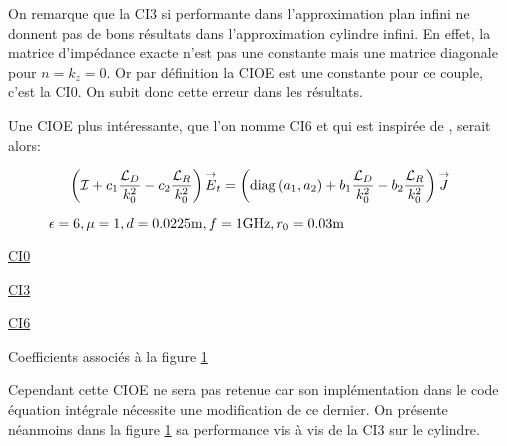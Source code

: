     On remarque que la CI3 si performante dans l'approximation plan infini ne donnent pas de bons résultats dans l’approximation cylindre infini. 
    En effet, la matrice d'impédance exacte n'est pas une constante mais une matrice diagonale pour \(n=k_z=0\). 
    Or par définition la CIOE est une constante pour ce couple, c'est la CI0. On subit donc cette erreur dans les résultats. 

    Une CIOE plus intéressante, que l'on nomme CI6 et qui est inspirée de \cite[p.~60]{hoppe_impedance_1995}, serait alors:

    \begin{equation}
      \left({\mathcal{I}} + c_1\dfrac{{\mathcal{L}_D}}{k_0^2} -c_2\dfrac{{\mathcal{L}_R}}{k_0^2}\right){\overset{\rightarrow}{E}}_t = \left(\operatorname{diag}\left(a_1,a_2\right) + b_1\dfrac{{\mathcal{L}_D}}{k_0^2} - b_2 \dfrac{{\mathcal{L}_R}}{k_0^2} \right){\overset{\rightarrow}{J}}
    \end{equation}

    \begin{figure}[!hbt]
      \centering
      
      \caption[CIOE sur empilement de Hoppe & Rahmat-Samii p.~62]{\(\epsilon = 6, \mu = 1, d=0.0225\text{m}, f=1\text{GHz}, r_0=0.03\text{m}\)}
      \label{fig:imp_fourier:plan:hoppe:62:hoibc:ibc6}
    \end{figure}
    \begin{table}[!hbt]
      \centering
      \begin{minipage}[t]{0.49\textwidth}
        \vspace{0pt}
        \centering
        \begin{coefftable}{\hyperlink{ci0}{CI0}}
          
        \end{coefftable}
        \begin{coefftable}{\hyperlink{ci3}{CI3}}
          
        \end{coefftable}
      \end{minipage}
      \begin{minipage}[t]{0.49\textwidth}
        \vspace{0pt}
        \centering
        \begin{coefftable}{\hyperlink{ci6}{CI6}}
          
        \end{coefftable}
      \end{minipage}
      \caption{Coefficients associés à la figure \ref{fig:imp_fourier:plan:hoppe:62:hoibc:ibc6}}
      \label{tab:imp_fourier:plan:hoppe:62:hoibc:ibc6}
    \end{table}

    Cependant cette CIOE ne sera pas retenue car son implémentation dans le code équation intégrale nécessite une modification de ce dernier. On présente néanmoins dans la figure \ref{fig:imp_fourier:plan:hoppe:62:hoibc:ibc6} sa performance vis à vis de la CI3 sur le cylindre.


